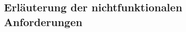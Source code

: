 \documentclass[a4paper,12pt]{article}
\begin{document}










\subsection{Erläuterung der nichtfunktionalen Anforderungen}
\end{document}
